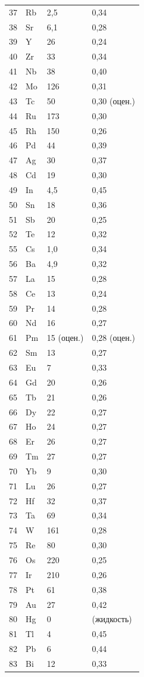 \documentclass[12pt,a4paper]{article}
\begin{document}
\begin{longtable}{p{0.6cm}p{1.2cm}p{1.5cm}p{1.5cm}}
		37 & Rb & 2,5 & 0,34 \\
		38 & Sr & 6,1 & 0,28 \\
		39 & Y  & 26 & 0,24 \\
		40 & Zr & 33 & 0,34 \\
		41 & Nb & 38 & 0,40 \\
		42 & Mo & 126 & 0,31 \\
		43 & Tc & 50 & 0,30 (оцен.) \\
		44 & Ru & 173 & 0,30 \\
		45 & Rh & 150 & 0,26 \\
		46 & Pd & 44 & 0,39 \\
		47 & Ag & 30 & 0,37 \\
		48 & Cd & 19 & 0,30 \\
		49 & In & 4,5 & 0,45 \\
		50 & Sn & 18 & 0,36 \\
		51 & Sb & 20 & 0,25 \\
		52 & Te & 12 & 0,32 \\
		55 & Cs & 1,0 & 0,34 \\
		56 & Ba & 4,9 & 0,32 \\
		57 & La & 15 & 0,28 \\
		58 & Ce & 13 & 0,24 \\
		59 & Pr & 14 & 0,28 \\
		60 & Nd & 16 & 0,27 \\
		61 & Pm & 15 (оцен.) & 0,28 (оцен.) \\
		62 & Sm & 13 & 0,27 \\
		63 & Eu & 7 & 0,33 \\
		64 & Gd & 20 & 0,26 \\
		65 & Tb & 21 & 0,26 \\
		66 & Dy & 22 & 0,27 \\
		67 & Ho & 24 & 0,27 \\
		68 & Er & 26 & 0,27 \\
		69 & Tm & 27 & 0,27 \\
		70 & Yb & 9 & 0,30 \\
		71 & Lu & 26 & 0,27 \\
		72 & Hf & 32 & 0,37 \\
		73 & Ta & 69 & 0,34 \\
		74 & W  & 161 & 0,28 \\
		75 & Re & 80 & 0,30 \\
		76 & Os & 220 & 0,25 \\
		77 & Ir & 210 & 0,26 \\
		78 & Pt & 61 & 0,38 \\
		79 & Au & 27 & 0,42 \\
		80 & Hg & 0 & (жидкость) \\
		81 & Tl & 4 & 0,45 \\
		82 & Pb & 6 & 0,44 \\
		83 & Bi & 12 & 0,33 \\
		\bottomrule
	\end{longtable}
	
\end{document}
